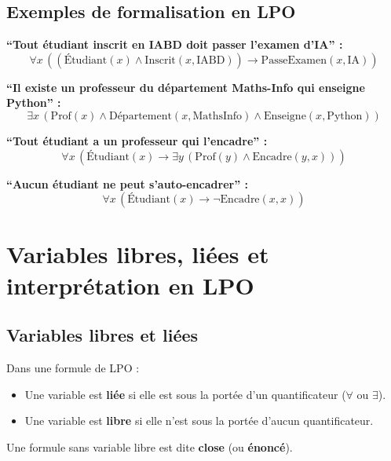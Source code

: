 \documentclass[11pt,a4paper]{article}
\begin{document}
\subsection{Exemples de formalisation en LPO}

\begin{exemplebox}
\textbf{``Tout étudiant inscrit en IABD doit passer l'examen d'IA'' :}
$$\forall x \, ((\text{Étudiant}(x) \land \text{Inscrit}(x, \text{IABD})) \rightarrow \text{PasseExamen}(x, \text{IA}))$$

\textbf{``Il existe un professeur du département Maths-Info qui enseigne Python'' :}
$$\exists x \, (\text{Prof}(x) \land \text{Département}(x, \text{MathsInfo}) \land \text{Enseigne}(x, \text{Python}))$$

\textbf{``Tout étudiant a un professeur qui l'encadre'' :}
$$\forall x \, (\text{Étudiant}(x) \rightarrow \exists y \, (\text{Prof}(y) \land \text{Encadre}(y, x)))$$

\textbf{``Aucun étudiant ne peut s'auto-encadrer'' :}
$$\forall x \, (\text{Étudiant}(x) \rightarrow \neg \text{Encadre}(x, x))$$
\end{exemplebox}

\section{Variables libres, liées et interprétation en LPO}

\subsection{Variables libres et liées}

\begin{definitionbox}
Dans une formule de LPO :
\begin{itemize}[nosep]
    \item Une variable est \textbf{liée} si elle est sous la portée d'un quantificateur ($\forall$ ou $\exists$).
    \item Une variable est \textbf{libre} si elle n'est sous la portée d'aucun quantificateur.
\end{itemize}
Une formule sans variable libre est dite \textbf{close} (ou \textbf{énoncé}).
\end{definitionbox}
\end{document}
